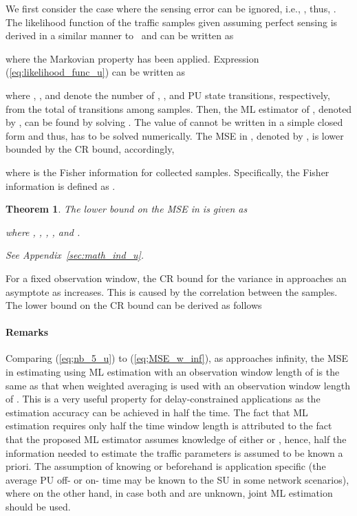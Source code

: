 \documentclass[11pt,draftclsnofoot,journal,onecolumn]{IEEEtran}
\newtheorem{theorem}{Theorem}
\begin{document}
We first consider the case where the sensing error can be ignored, i.e., , thus, . The likelihood function of the traffic samples given  assuming perfect sensing is derived in a similar manner to~\cite[Sec. 6.1]{kim_tmc_2008} and can be written as

where the Markovian property has been applied. Expression (\ref{eq:likelihood_func_u}) can be written as

where , ,  and  denote the number of , ,  and  PU state transitions, respectively, from the total of  transitions among  samples. Then, the ML estimator of , denoted by , can be found by solving . The value of  cannot be written in a simple closed form and thus, has to be solved numerically. The MSE in , denoted by , is lower bounded by the CR bound, accordingly, 

where  is the Fisher information for  collected samples. Specifically, the Fisher information is defined as .
\begin{theorem}
The lower bound on the MSE in  is given as

where , , , , and .

\begin{IEEEproof}
See Appendix~\ref{sec:math_ind_u}.
\end{IEEEproof}
\end{theorem}

For a fixed observation window, the CR bound for the variance in  approaches an asymptote as  increases. This is caused by the correlation between the samples. The lower bound on the CR bound can be derived as follows

\paragraph*{Remarks}

Comparing (\ref{eq;nb_5_u}) to (\ref{eq;MSE_w_inf}), as  approaches infinity, the MSE in estimating  using ML estimation with an observation window length of  is the same as that when weighted averaging is used with an observation window length of . This is a very useful property for delay-constrained applications as the estimation accuracy can be achieved in half the time. The fact that ML estimation requires only half the time window length is attributed to the fact that the proposed ML estimator assumes knowledge of either  or , hence, half the information needed to estimate the traffic parameters is assumed to be known a priori. The assumption of knowing  or  beforehand is application specific (the average PU off- or on- time may be known to the SU in some network scenarios), where on the other hand, in case both  and  are unknown, joint ML estimation should be used.
\end{document}
